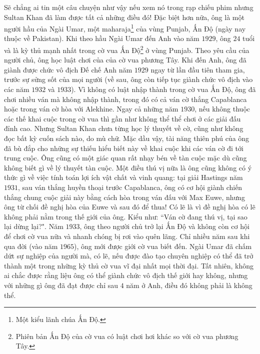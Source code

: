\begin{multicols}{2}
\begin{figure}[H]
		\vspace*{-10pt}
	\end{figure}
	Sẽ chẳng ai tin một câu chuyện như vậy nếu xem nó trong rạp chiếu phim nhưng Sultan Khan đã làm được tất cả những điều đó! Đặc biệt hơn nữa, ông là một người hầu của Ngài Umar, một maharaja\footnote[2]{\color{gocco}Một kiểu lãnh chúa Ấn Độ.} của vùng Punjab, Ấn Độ (ngày nay thuộc về Pakistan). Khi theo hầu Ngài Umar đến Anh vào năm $1929$, ông $24$ tuổi và là kỳ thủ mạnh nhất trong cờ vua Ấn Độ\footnote[3]{\color{gocco}Phiên bản Ấn Độ của cờ vua có luật chơi hơi khác so với cờ vua phương Tây.} ở vùng Punjab. Theo yêu cầu của người chủ, ông học luật chơi của của cờ vua phương Tây.
	\vskip 0.1cm
	Khi đến Anh, ông đã giành được chức vô địch Đế chế Anh năm $1929$ ngay từ lần đầu tiên tham gia, trước sự sửng sốt của mọi người (về sau, ông còn tiếp tục giành chức vô địch vào các năm $1932$ và $1933$). Vì không có luật nhập thành trong cờ vua Ấn Độ, ông đã chơi nhiều ván mà không nhập thành, trong đó có cả ván cờ thắng Capablanca hoặc trong ván cờ hòa với Alekhine. Ngay cả những năm $1930$, nếu không thuộc các thế khai cuộc trong cờ vua thì gần như không thể thể chơi ở các giải đấu đỉnh cao. Nhưng Sultan Khan chưa từng học lý thuyết về cờ, cũng như không đọc bất kỳ cuốn sách nào, do mù chữ. Mặc dầu vậy, tài năng thiên phú của ông đã bù đắp cho những sự thiếu hiểu biết này về khai cuộc khi các ván cờ đi tới trung cuộc. Ông cũng có một giác quan rất nhạy bén về tàn cuộc mặc dù cũng không biết gì về lý thuyết tàn cuộc. Một điều thú vị nữa là ông cũng không có ý thức gì về việc tính toán lợi ích vật chất và vinh quang: tại giải Hastings năm $1931$, sau ván thắng huyền thoại trước Capablanca, ông có cơ hội giành chiến thắng chung cuộc giải này bằng cách hòa trong ván đấu với Max Euwe, nhưng ông từ chối đề nghị hòa của Euwe và sau đó để thua! Có lẽ là vì đề nghị hòa có lẽ không phải nằm trong thế giới của ông. Kiểu như: ``Ván cờ đang thú vị, tại sao lại dừng lại?".
	\vskip 0.1cm
	Năm $1933$, ông theo người chủ trở lại Ấn Độ và không còn cơ hội để chơi cờ vua nữa và nhanh chóng bị rơi vào quên lãng. Chỉ nhiều năm sau khi qua đời (vào năm $1965$), ông mới được giới cờ vua biết đến. Ngài Umar đã chấm dứt sự nghiệp của người mà, có lẽ, nếu được đào tạo chuyên nghiệp có thể đã trở thành một trong những kỳ thủ cờ vua vĩ đại nhất mọi thời đại. Tất nhiên, không ai chắc được rằng liệu ông có thể giành chức vô địch thế giới hay không, nhưng với những gì ông đã đạt được chỉ sau $4$ năm ở Anh, điều đó không phải là không thể. 

\end{multicols}
